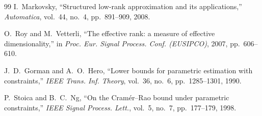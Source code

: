 \documentclass[journal]{IEEEtran}
\begin{document}
\begin{thebibliography}{99}
 I.~Markovsky, ``Structured low-rank approximation and
its applications,'' \emph{Automatica}, vol.~44, no.~4, pp.~891--909, 2008.

 O.~Roy and M.~Vetterli, ``The effective rank: a
measure of effective dimensionality,'' in \emph{Proc. Eur. Signal Process.
Conf. (EUSIPCO)}, 2007, pp.~606--610.

 J.~D.~Gorman and A.~O.~Hero, ``Lower bounds for parametric
estimation with constraints,'' \emph{IEEE Trans. Inf. Theory}, vol.~36, no.~6,
pp.~1285--1301, 1990.

 P.~Stoica and B.~C.~Ng, ``On the Cram\'er--Rao bound under
parametric constraints,'' \emph{IEEE Signal Process. Lett.}, vol.~5, no.~7,
pp.~177--179, 1998.
\end{thebibliography}
\end{document}
